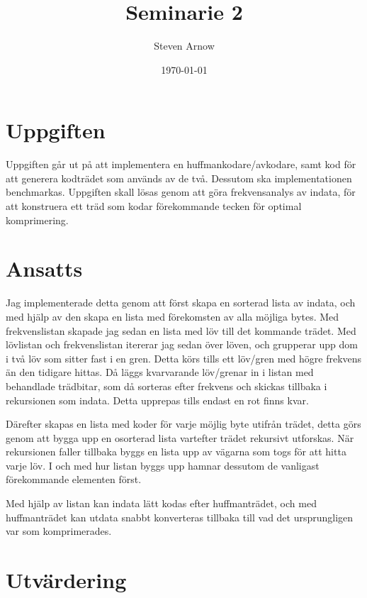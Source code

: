 \documentclass[a4paper, 11pt]{article}
\title{Seminarie 2}
\author{Steven Arnow}
\date{\today}
\begin{document}
\maketitle 

\section{Uppgiften}

Uppgiften går ut på att implementera en huffmankodare/avkodare, samt kod för att generera kodträdet som används av de två. Dessutom ska implementationen benchmarkas. Uppgiften skall lösas genom att göra frekvensanalys av indata, för att konstruera ett träd som kodar förekommande tecken för optimal komprimering. 

\section{Ansatts}

Jag implementerade detta genom att först skapa en sorterad lista av indata, och med hjälp av den skapa en lista med förekomsten av alla möjliga bytes. Med frekvenslistan skapade jag sedan en lista med löv till det kommande trädet. Med lövlistan och frekvenslistan itererar jag sedan över löven, och grupperar upp dom i två löv som sitter fast i en gren. Detta körs tills ett löv/gren med högre frekvens än den tidigare hittas. Då läggs kvarvarande löv/grenar in i listan med behandlade trädbitar, som då sorteras efter frekvens och skickas tillbaka i rekursionen som indata. Detta upprepas tills endast en rot finns kvar.

Därefter skapas en lista med koder för varje möjlig byte utifrån trädet, detta görs genom att bygga upp en osorterad lista vartefter trädet rekursivt utforskas. När rekursionen faller tillbaka byggs en lista upp av vägarna som togs för att hitta varje löv. I och med hur listan byggs upp hamnar dessutom de vanligast förekommande elementen först.

Med hjälp av listan kan indata lätt kodas efter huffmanträdet, och med huffmanträdet kan utdata snabbt konverteras tillbaka till vad det ursprungligen var som komprimerades.

\section{Utvärdering}
\end{document}
